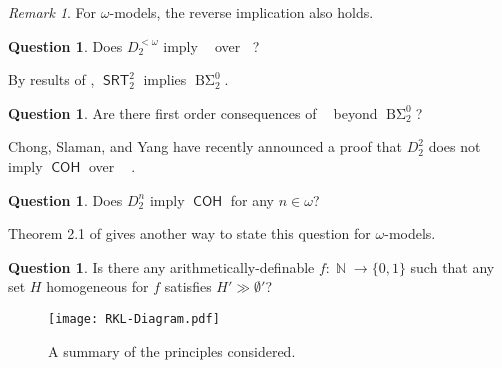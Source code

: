\documentclass{amsart}
\theoremstyle{plain}
\theoremstyle{remark}
\newtheorem{remark}[theorem]{Remark}
\theoremstyle{definition}
\newtheorem{question}[theorem]{Question}
\DeclareMathOperator{\BSigma}{B\Sigma}
\DeclareMathOperator{\RCA}{\mathsf{RCA}_0}
\DeclareMathOperator{\SRT}{\mathsf{SRT}}
\DeclareMathOperator{\COH}{\mathsf{COH}}
\DeclareMathOperator{\RKLa}{\mathsf{RKL}^{(<\omega)}}
\DeclareMathOperator{\N}{\mathbb{N}}
\begin{document}
\begin{remark}
	For $\omega$-models, the reverse implication also holds.
\end{remark}

\begin{question}
Does $D^{<\omega}_2$ imply $\RKLa$ over $\RCA$?
\end{question}


By results of \cite{CJS}, $\SRT^2_2$ implies $\BSigma^0_2$.

\begin{question}
Are there first order consequences of $\RKLa$ beyond $\BSigma^0_2$?
\end{question}

Chong, Slaman, and Yang have recently announced a proof that $D^2_2$ does not imply $\COH$ over $\RCA$ \cite{separate-rt-srt}. 

\begin{question}
Does $D^n_2$ imply $\COH$ for any $n\in\omega$?
\end{question}

Theorem 2.1 of \cite{coh-not-high} gives another way to state this question for $\omega$-models.

\begin{question}
Is there any arithmetically-definable $f:\N\rightarrow\{0,1\}$ such that any set $H$ homogeneous for $f$ satisfies $H'\gg \emptyset'$?
\end{question}


\begin{figure}%
\centering
\texttt{[image: RKL-Diagram.pdf]}
\caption{A summary of the principles considered.}%
\label{fig.summary}%
\end{figure}




\nocite{CJS-correction}
\end{document}

